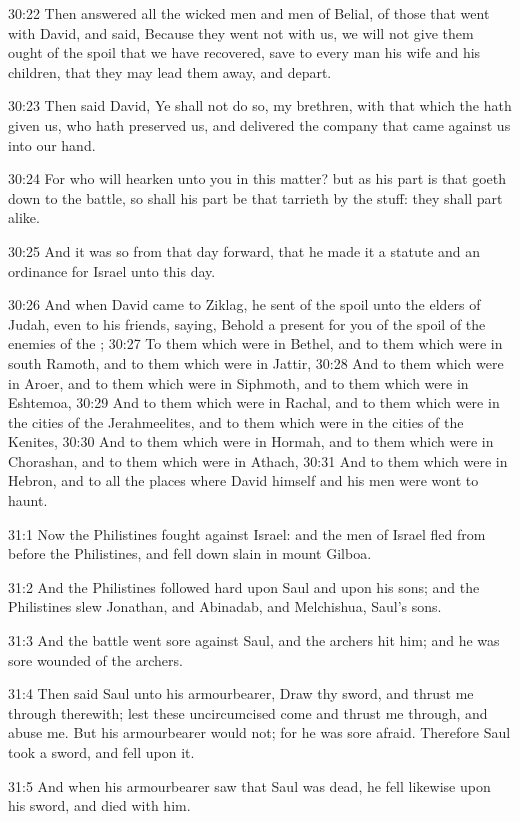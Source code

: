 30:22 Then answered all the wicked men and men of Belial, of those
that went with David, and said, Because they went not with us, we will
not give them ought of the spoil that we have recovered, save to every
man his wife and his children, that they may lead them away, and
depart.

30:23 Then said David, Ye shall not do so, my brethren, with that
which the \LORD hath given us, who hath preserved us, and delivered the
company that came against us into our hand.

30:24 For who will hearken unto you in this matter? but as his part is
that goeth down to the battle, so shall his part be that tarrieth by
the stuff: they shall part alike.

30:25 And it was so from that day forward, that he made it a statute
and an ordinance for Israel unto this day.

30:26 And when David came to Ziklag, he sent of the spoil unto the
elders of Judah, even to his friends, saying, Behold a present for you
of the spoil of the enemies of the \LORD; 30:27 To them which were in
Bethel, and to them which were in south Ramoth, and to them which were
in Jattir, 30:28 And to them which were in Aroer, and to them which
were in Siphmoth, and to them which were in Eshtemoa, 30:29 And to
them which were in Rachal, and to them which were in the cities of the
Jerahmeelites, and to them which were in the cities of the Kenites,
30:30 And to them which were in Hormah, and to them which were in
Chorashan, and to them which were in Athach, 30:31 And to them which
were in Hebron, and to all the places where David himself and his men
were wont to haunt.

31:1 Now the Philistines fought against Israel: and the men of Israel
fled from before the Philistines, and fell down slain in mount Gilboa.

31:2 And the Philistines followed hard upon Saul and upon his sons;
and the Philistines slew Jonathan, and Abinadab, and Melchishua,
Saul's sons.

31:3 And the battle went sore against Saul, and the archers hit him;
and he was sore wounded of the archers.

31:4 Then said Saul unto his armourbearer, Draw thy sword, and thrust
me through therewith; lest these uncircumcised come and thrust me
through, and abuse me. But his armourbearer would not; for he was sore
afraid. Therefore Saul took a sword, and fell upon it.

31:5 And when his armourbearer saw that Saul was dead, he fell
likewise upon his sword, and died with him.

